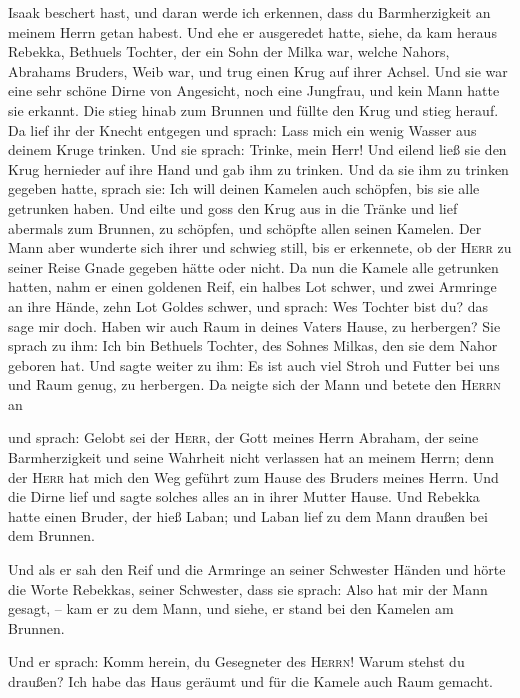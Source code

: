 Isaak beschert hast, und daran werde ich erkennen, dass du
Barmherzigkeit an meinem Herrn getan habest.  Und ehe er
ausgeredet hatte, siehe, da kam heraus Rebekka, Bethuels Tochter, der
ein Sohn der Milka war, welche Nahors, Abrahams Bruders, Weib war, und
trug einen Krug auf ihrer Achsel.  Und sie war eine sehr
schöne Dirne von Angesicht, noch eine Jungfrau, und kein Mann hatte sie
erkannt. Die stieg hinab zum Brunnen und füllte den Krug und stieg
herauf.  Da lief ihr der Knecht entgegen und sprach: Lass
mich ein wenig Wasser aus deinem Kruge trinken.  Und sie
sprach: Trinke, mein Herr! Und eilend ließ sie den Krug hernieder auf
ihre Hand und gab ihm zu trinken.  Und da sie ihm zu
trinken gegeben hatte, sprach sie: Ich will deinen Kamelen auch
schöpfen, bis sie alle getrunken haben.  Und eilte und
goss den Krug aus in die Tränke und lief abermals zum Brunnen, zu
schöpfen, und schöpfte allen seinen Kamelen.  Der Mann
aber wunderte sich ihrer und schwieg still, bis er erkennete, ob der
\textsc{Herr} zu seiner Reise Gnade gegeben hätte oder nicht.
 Da nun die Kamele alle getrunken hatten, nahm er einen
goldenen Reif, ein halbes Lot schwer, und zwei Armringe an ihre Hände,
zehn Lot Goldes schwer,  und sprach: Wes Tochter bist du?
das sage mir doch. Haben wir auch Raum in deines Vaters Hause, zu
herbergen?  Sie sprach zu ihm: Ich bin Bethuels Tochter,
des Sohnes Milkas, den sie dem Nahor geboren hat.  Und
sagte weiter zu ihm: Es ist auch viel Stroh und Futter bei uns und Raum
genug, zu herbergen.  Da neigte sich der Mann und betete
den \textsc{Herrn} an

 und sprach: Gelobt sei der \textsc{Herr}, der Gott
meines Herrn Abraham, der seine Barmherzigkeit und seine Wahrheit nicht
verlassen hat an meinem Herrn; denn der \textsc{Herr} hat mich den Weg
geführt zum Hause des Bruders meines Herrn.  Und die
Dirne lief und sagte solches alles an in ihrer Mutter Hause.
 Und Rebekka hatte einen Bruder, der hieß Laban; und
Laban lief zu dem Mann draußen bei dem Brunnen.

 Und als er sah den Reif und die Armringe an seiner
Schwester Händen und hörte die Worte Rebekkas, seiner Schwester, dass
sie sprach: Also hat mir der Mann gesagt, -- kam er zu dem Mann, und
siehe, er stand bei den Kamelen am Brunnen.

 Und er sprach: Komm herein, du Gesegneter des
\textsc{Herrn}! Warum stehst du draußen? Ich habe das Haus geräumt und
für die Kamele auch Raum gemacht.

